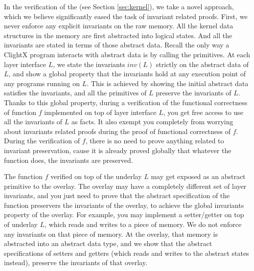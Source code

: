 In the verification of the \mCTOS{} (see Section \ref{sec:kernel}),
we take a novel approach, which we believe significantly eased the task of invariant
related proofs. 
First, we never enforce any explicit invariants on the raw memory. All the kernel data
structures in the memory are first abstracted into logical states. And all the
invariants are stated in terms of those abstract data. Recall the only way
a ClightX program interacts with abstract data is by calling the primitives.
At each layer interface $L$, we state the invariants $inv(L)$ strictly on the abstract
data of $L$, and show a global property that the invariants hold at any execution
point of any programs running on $L$. This is achieved by showing the initial
abstract data satisfies the invariants, and all the primitives of $L$ preserve
the invariants of $L$. 
Thanks to this global property, during a verification of the functional correctness
of function $f$ implemented on top of layer interface $L$, you get free access to use all the invariants
of $L$ as facts. It also exempt you completely from worrying about invariants
related proofs during the proof of functional correctness of $f$.
During the verification of $f$, there is no need
to prove anything related to invariant preservation, cause it is already proved globally
that whatever the function does, the invariants are preserved.

The function $f$ verified on top of the underlay $L$ may get exposed as an abstract primitive to
the overlay. The overlay may have a completely different set of layer invariants,
and you just need to prove that the abstract specification of the function preservers
the invariants of the overlay, to achieve the global invariants property of the
overlay.
For example, you may implement a setter/getter on top of underlay $L$, which reads and writes to
a piece of memory. We do not enforce any invariants on that piece of memory. At the
overlay, that memory is abstracted into an abstract data type, and we show that
the abstract specifications of setters and getters (which reads and writes to the
abstract states instead), preserve the invariants of that overlay.

